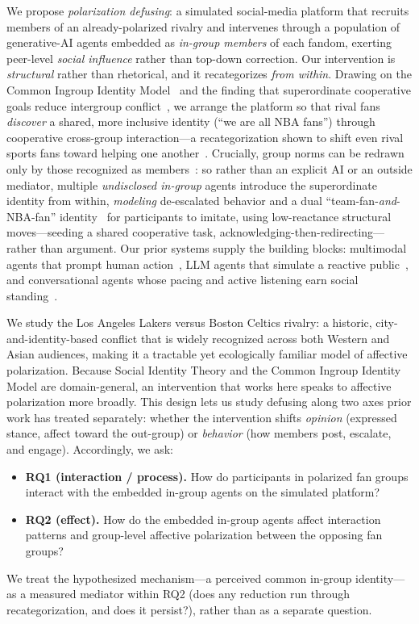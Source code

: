 We propose \emph{polarization defusing}: a simulated social-media platform that
recruits members of an already-polarized rivalry and intervenes through a population
of generative-AI agents embedded as \emph{in-group members} of each fandom, exerting
peer-level \emph{social influence} rather than top-down correction. Our intervention
is \emph{structural} rather than rhetorical, and it recategorizes \emph{from within}.
Drawing on the Common Ingroup Identity Model~\cite{gaertner2000reducing} and the
finding that superordinate cooperative goals reduce intergroup
conflict~\cite{sherif1961robbers,pettigrew2006contact}, we arrange the platform so
that rival fans \emph{discover} a shared, more inclusive identity (``we are all NBA
fans'') through cooperative cross-group interaction---a recategorization shown to
shift even rival sports fans toward helping one another~\cite{levine2005identity}.
Crucially, group norms can be redrawn only by those recognized as
members~\cite{tajfel1979sit,turner1987selfcat}: so rather than an explicit AI or an
outside mediator, multiple \emph{undisclosed in-group} agents introduce the
superordinate identity from within, \emph{modeling} de-escalated behavior and a dual
``team-fan-\emph{and}-NBA-fan'' identity~\cite{crisp2006recategorization} for
participants to imitate, using low-reactance structural moves---seeding a shared
cooperative task, acknowledging-then-redirecting---rather than argument. Our prior
systems supply the building blocks: multimodal agents that prompt human
action~\cite{zhang2025ecoecho}, LLM agents that simulate a reactive
public~\cite{tang2025breaking}, and conversational agents whose pacing and active
listening earn social standing~\cite{jiang2026hear}.

We study the Los Angeles Lakers versus Boston Celtics rivalry: a historic,
city-and-identity-based conflict that is widely recognized across both Western and
Asian audiences, making it a tractable yet ecologically familiar model of affective
polarization. Because Social Identity Theory and the Common Ingroup Identity Model
are domain-general, an intervention that works here speaks to affective
polarization more broadly. This design lets us study defusing along two axes prior
work has treated separately: whether the intervention shifts \emph{opinion}
(expressed stance, affect toward the out-group) or \emph{behavior} (how members
post, escalate, and engage). Accordingly, we ask:
\begin{itemize}
  \item \textbf{RQ1 (interaction / process).} How do participants in polarized fan
  groups interact with the embedded in-group agents on the simulated platform?
  \item \textbf{RQ2 (effect).} How do the embedded in-group agents affect
  interaction patterns and group-level affective polarization between the opposing
  fan groups?
\end{itemize}
We treat the hypothesized mechanism---a perceived common in-group
identity---as a measured mediator within RQ2 (does any reduction run through
recategorization, and does it persist?), rather than as a separate question.

